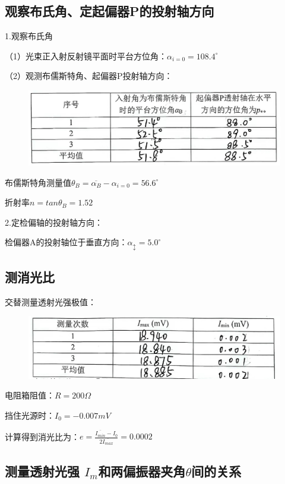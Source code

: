 \documentclass[UTF8]{ctexart}
\begin{document}
\subsection{观察布氏角、定起偏器P的投射轴方向}

\noindent 1.观察布氏角

\noindent（1）光束正入射反射镜平面时平台方位角：$\alpha_{i=0}=108.4^\circ$

\noindent （2）观测布儒斯特角、起偏器P投射轴方向：

\begin{figure}[H]
  \centering
  \includegraphics[scale=0.2]{5.jpg}
\end{figure}

布儒斯特角测量值$\theta_B=\overline{\alpha_B}-\alpha_{i=0}=56.6^\circ$

折射率$n=tan\theta_B=1.52$

\noindent 2.定检偏轴的投射轴方向：

检偏器A的投射轴位于垂直方向：$\alpha_{\updownarrow}={5.0}^\circ$



\subsection{测消光比}
交替测量透射光强极值：
\begin{figure}[H]
  \centering
  \includegraphics[scale=0.2]{6.jpg}
\end{figure}
电阻箱阻值：$R=200\Omega$

挡住光源时：$I_0=-0.007mV$

计算得到消光比为：$e=\frac{\overline{I_{min}}-I_0}{2\overline{I_{max}}}=0.0002$

\subsection{测量透射光强 $I_m$和两偏振器夹角$\theta$间的关系}
\end{document}
